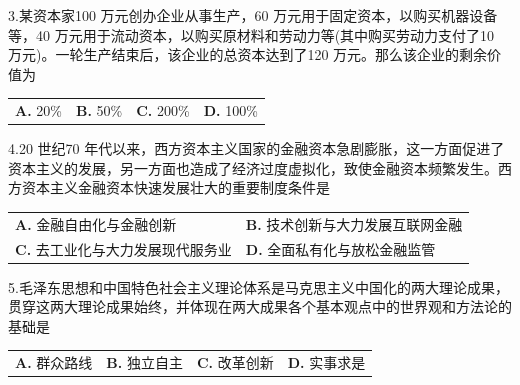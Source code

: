 \documentclass[UTF8,11pt]{ctexart}
\begin{document}
3.某资本家100 万元创办企业从事生产，60 万元用于固定资本，以购买机器设备等，40 万元用于流动资本，以购买原材料和劳动力等(其中购买劳动力支付了10 万元)。一轮生产结束后，该企业的总资本达到了120 万元。那么该企业的剩余价值为


\begin{center}\begin{tabular}{>{\raggedright\arraybackslash}p{\dimexpr(\linewidth-8\tabcolsep)/4\relax}>{\raggedright\arraybackslash}p{\dimexpr(\linewidth-8\tabcolsep)/4\relax}>{\raggedright\arraybackslash}p{\dimexpr(\linewidth-8\tabcolsep)/4\relax}>{\raggedright\arraybackslash}p{\dimexpr(\linewidth-8\tabcolsep)/4\relax}}
\textbf{A.} 20\% & \textbf{B.} 50\% & \textbf{C.} 200\% & \textbf{D.} 100\%\\[.35em]\end{tabular}\end{center}

4.20 世纪70 年代以来，西方资本主义国家的金融资本急剧膨胀，这一方面促进了资本主义的发展，另一方面也造成了经济过度虚拟化，致使金融资本频繁发生。西方资本主义金融资本快速发展壮大的重要制度条件是


\begin{center}\begin{tabular}{>{\raggedright\arraybackslash}p{\dimexpr(\linewidth-4\tabcolsep)/2\relax}>{\raggedright\arraybackslash}p{\dimexpr(\linewidth-4\tabcolsep)/2\relax}}
\textbf{A.} 金融自由化与金融创新 & \textbf{B.} 技术创新与大力发展互联网金融\\[.35em]
\textbf{C.} 去工业化与大力发展现代服务业 & \textbf{D.} 全面私有化与放松金融监管\\[.35em]\end{tabular}\end{center}

5.毛泽东思想和中国特色社会主义理论体系是马克思主义中国化的两大理论成果，贯穿这两大理论成果始终，并体现在两大成果各个基本观点中的世界观和方法论的基础是


\begin{center}\begin{tabular}{>{\raggedright\arraybackslash}p{\dimexpr(\linewidth-8\tabcolsep)/4\relax}>{\raggedright\arraybackslash}p{\dimexpr(\linewidth-8\tabcolsep)/4\relax}>{\raggedright\arraybackslash}p{\dimexpr(\linewidth-8\tabcolsep)/4\relax}>{\raggedright\arraybackslash}p{\dimexpr(\linewidth-8\tabcolsep)/4\relax}}
\textbf{A.} 群众路线 & \textbf{B.} 独立自主 & \textbf{C.} 改革创新 & \textbf{D.} 实事求是\\[.35em]\end{tabular}\end{center}
\end{document}
